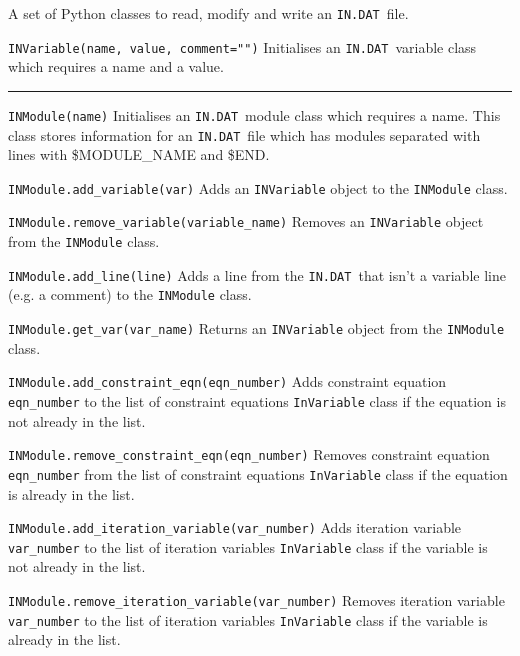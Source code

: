 \documentclass[11pt,a4paper]{report}
\newcommand{\indat}{\mbox{\texttt{IN.DAT}}}
\begin{document}
A set of Python classes to read, modify and write an \indat\ file.

\begin{description}

\item{\verb|INVariable(name, value, comment="")| } Initialises an \indat\
  variable class which requires a name and a value.

\end{description}

\rule{\textwidth}{0.4pt}

\begin{description}

\item{\verb|INModule(name)|} Initialises an \indat\ module class which
  requires a name. This class stores information for an \indat\ file which has
  modules separated with lines with \$MODULE\_NAME and \$END.

\item{\verb|INModule.add_variable(var)|} Adds an \verb|INVariable| object to
  the \verb|INModule| class.

\item{\verb|INModule.remove_variable(variable_name)|} Removes an
  \verb|INVariable| object from the \verb|INModule| class.

\item{\verb|INModule.add_line(line)|} Adds a line from the \indat\ that isn't
  a variable line (e.g. a comment) to the \verb|INModule| class.

\item{\verb|INModule.get_var(var_name)|} Returns an \verb|INVariable| object
  from the \verb|INModule| class.

\item{\verb|INModule.add_constraint_eqn(eqn_number)|} Adds constraint
  equation \verb|eqn_number| to the list of constraint equations
  \verb|InVariable| class if the equation is not already in the list.

\item{\verb|INModule.remove_constraint_eqn(eqn_number)|} Removes
  constraint equation \verb|eqn_number| from the list of constraint
  equations \verb|InVariable| class if the equation is already in the list.

\item{\verb|INModule.add_iteration_variable(var_number)|} Adds iteration
  variable \verb|var_number| to the list of iteration variables
  \verb|InVariable| class if the variable is not already in the list.

\item{\verb|INModule.remove_iteration_variable(var_number)|} Removes
  iteration variable \verb|var_number| to the list of iteration variables
  \verb|InVariable| class if the variable is already in the list.

\end{description}
\end{document}

